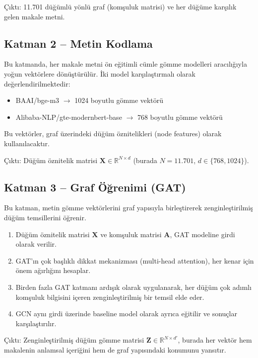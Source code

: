 \documentclass[12pt, a4paper]{article}
\begin{document}
Çıktı: 11.701 düğümlü yönlü graf (komşuluk matrisi) ve her düğüme karşılık gelen makale metni.

\subsection{Katman 2 -- Metin Kodlama}

Bu katmanda, her makale metni ön eğitimli cümle gömme modelleri aracılığıyla yoğun vektörlere dönüştürülür. İki model karşılaştırmalı olarak değerlendirilmektedir:

\begin{itemize}
    \item BAAI/bge-m3 $\rightarrow$ 1024 boyutlu gömme vektörü
    \item Alibaba-NLP/gte-modernbert-base $\rightarrow$ 768 boyutlu gömme vektörü
\end{itemize}

Bu vektörler, graf üzerindeki düğüm öznitelikleri (node features) olarak kullanılacaktır.

Çıktı: Düğüm öznitelik matrisi $\mathbf{X} \in \mathbb{R}^{N \times d}$ (burada $N = 11.701$, $d \in \{768, 1024\}$).

\subsection{Katman 3 -- Graf Öğrenimi (GAT)}

Bu katman, metin gömme vektörlerini graf yapısıyla birleştirerek zenginleştirilmiş düğüm temsillerini öğrenir.

\begin{enumerate}
    \item Düğüm öznitelik matrisi $\mathbf{X}$ ve komşuluk matrisi $\mathbf{A}$, GAT modeline girdi olarak verilir.
    \item GAT'ın çok başlıklı dikkat mekanizması (multi-head attention), her kenar için önem ağırlığını hesaplar.
    \item Birden fazla GAT katmanı ardışık olarak uygulanarak, her düğüm çok adımlı komşuluk bilgisini içeren zenginleştirilmiş bir temsil elde eder.
    \item GCN aynı girdi üzerinde baseline model olarak ayrıca eğitilir ve sonuçlar karşılaştırılır.
\end{enumerate}

Çıktı: Zenginleştirilmiş düğüm gömme matrisi $\mathbf{Z} \in \mathbb{R}^{N \times d'}$, burada her vektör hem makalenin anlamsal içeriğini hem de graf yapısındaki konumunu yansıtır.
\end{document}
